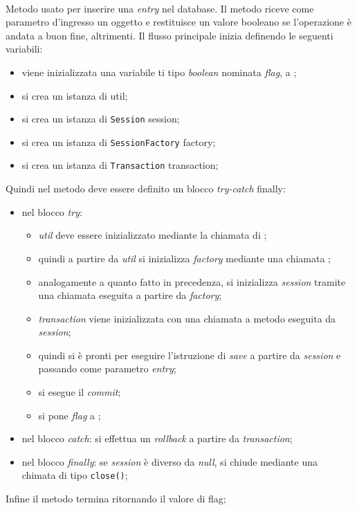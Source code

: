 \begin{description}
	\item{}\\
	Metodo usato per inserire una \textit{entry} nel database. Il metodo riceve come parametro d'ingresso un oggetto  e restituisce un valore booleano  se l'operazione è andata a buon fine,  altrimenti. Il flusso principale inizia definendo le seguenti variabili:
	\begin{itemize}
		\item viene inizializzata una variabile ti tipo \textit{boolean} nominata \textit{flag}, a ;
		\item si crea un istanza di  util;
		\item si crea un istanza di \texttt{Session} session;
		\item si crea un istanza di \texttt{SessionFactory} factory;
		\item si crea un istanza di \texttt{Transaction} transaction;
	\end{itemize}
	Quindi nel metodo deve essere definito un blocco \textit{try-catch} finally:
	\begin{itemize}
		\item nel blocco \textit{try}:
		\begin{itemize}
			\item \textit{util} deve essere inizializzato mediante la chiamata  di ;
			\item quindi a partire da \textit{util} si inizializza \textit{factory} mediante una chiamata ;
			\item analogamente a quanto fatto in precedenza, si inizializza \textit{session} tramite una chiamata  eseguita a partire da \textit{factory};
			\item \textit{transaction} viene inizializzata con una chiamata a metodo  eseguita da \textit{session};
			\item quindi si è pronti per eseguire l'istruzione di \textit{save} a partire da \textit{session} e passando come parametro \textit{entry};
			\item si esegue il \textit{commit};
			\item si pone \textit{flag} a ;
		\end{itemize}
		\item nel blocco \textit{catch}: si effettua un \textit{rollback} a partire da \textit{transaction};
		\item nel blocco \textit{finally}: se \textit{session} è diverso da \textit{null}, si chiude mediante una chimata di tipo \texttt{close()};
	\end{itemize}
	Infine il metodo termina ritornando il valore di flag;
	
\end{description}

